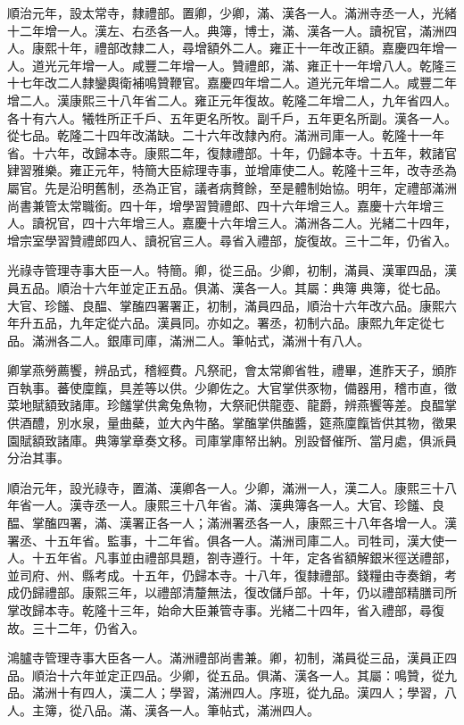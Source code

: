 \begin{pinyinscope}
順治元年，設太常寺，隸禮部。置卿，少卿，滿、漢各一人。滿洲寺丞一人，光緒十二年增一人。漢左、右丞各一人。典簿，博士，滿、漢各一人。讀祝官，滿洲四人。康熙十年，禮部改隸二人，尋增額外二人。雍正十一年改正額。嘉慶四年增一人。道光元年增一人。咸豐二年增一人。贊禮郎，滿、雍正十一年增八人。乾隆三十七年改二人隸鑾輿衛補鳴贊鞭官。嘉慶四年增二人。道光元年增二人。咸豐二年增二人。漢康熙三十八年省二人。雍正元年復故。乾隆二年增二人，九年省四人。各十有六人。犧牲所正千戶、五年更名所牧。副千戶，五年更名所副。漢各一人。從七品。乾隆二十四年改滿缺。二十六年改隸內府。滿洲司庫一人。乾隆十一年省。十六年，改歸本寺。康熙二年，復隸禮部。十年，仍歸本寺。十五年，敕諸官肄習雅樂。雍正元年，特簡大臣綜理寺事，並增庫使二人。乾隆十三年，改寺丞為屬官。先是沿明舊制，丞為正官，議者病贅餘，至是體制始協。明年，定禮部滿洲尚書兼管太常職銜。四十年，增學習贊禮郎、四十六年增三人。嘉慶十六年增三人。讀祝官，四十六年增三人。嘉慶十六年增三人。滿洲各二人。光緒二十四年，增宗室學習贊禮郎四人、讀祝官三人。尋省入禮部，旋復故。三十二年，仍省入。

光祿寺管理寺事大臣一人。特簡。卿，從三品。少卿，初制，滿員、漢軍四品，漢員五品。順治十六年並定正五品。俱滿、漢各一人。其屬：典簿典簿，從七品。大官、珍饈、良醖、掌醢四署署正，初制，滿員四品，順治十六年改六品。康熙六年升五品，九年定從六品。漢員同。亦如之。署丞，初制六品。康熙九年定從七品。滿洲各二人。銀庫司庫，滿洲二人。筆帖式，滿洲十有八人。

卿掌燕勞薦饗，辨品式，稽經費。凡祭祀，會太常卿省牲，禮畢，進胙天子，頒胙百執事。蕃使廩餼，具差等以供。少卿佐之。大官掌供豕物，備器用，稽市直，徵菜地賦額致諸庫。珍饈掌供禽兔魚物，大祭祀供龍壺、龍爵，辨燕饗等差。良醖掌供酒醴，別水泉，量曲蘗，並大內牛酪。掌醢掌供醢醬，筵燕廩餼皆供其物，徵果園賦額致諸庫。典簿掌章奏文移。司庫掌庫帑出納。別設督催所、當月處，俱派員分治其事。

順治元年，設光祿寺，置滿、漢卿各一人。少卿，滿洲一人，漢二人。康熙三十八年省一人。漢寺丞一人。康熙三十八年省。滿、漢典簿各一人。大官、珍饈、良醖、掌醢四署，滿、漢署正各一人；滿洲署丞各一人，康熙三十八年各增一人。漢署丞、十五年省。監事，十二年省。俱各一人。滿洲司庫二人。司牲司，漢大使一人。十五年省。凡事並由禮部具題，劄寺遵行。十年，定各省額解銀米徑送禮部，並司府、州、縣考成。十五年，仍歸本寺。十八年，復隸禮部。錢糧由寺奏銷，考成仍歸禮部。康熙三年，以禮部清釐無法，復改儲戶部。十年，仍以禮部精膳司所掌改歸本寺。乾隆十三年，始命大臣兼管寺事。光緒二十四年，省入禮部，尋復故。三十二年，仍省入。

鴻臚寺管理寺事大臣各一人。滿洲禮部尚書兼。卿，初制，滿員從三品，漢員正四品。順治十六年並定正四品。少卿，從五品。俱滿、漢各一人。其屬：鳴贊，從九品。滿洲十有四人，漢二人；學習，滿洲四人。序班，從九品。漢四人；學習，八人。主簿，從八品。滿、漢各一人。筆帖式，滿洲四人。


\end{pinyinscope}
